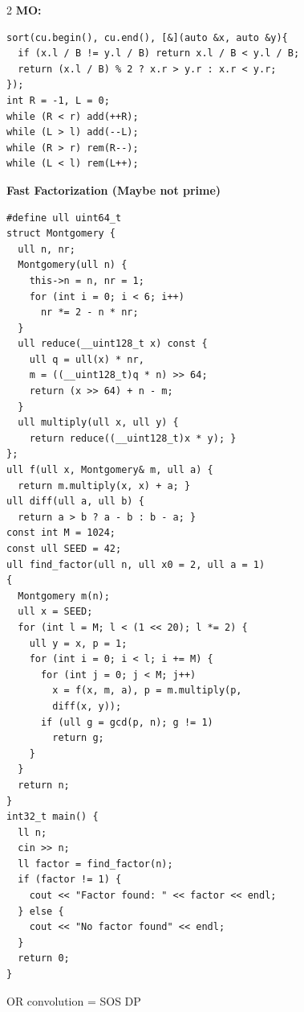 \documentclass[10pt,a4paper]{article}
\begin{document}
\begin{paracol}{2}
\textbf{MO:}
\begin{lstlisting}
sort(cu.begin(), cu.end(), [&](auto &x, auto &y){
  if (x.l / B != y.l / B) return x.l / B < y.l / B;
  return (x.l / B) % 2 ? x.r > y.r : x.r < y.r;
});
int R = -1, L = 0;
while (R < r) add(++R);
while (L > l) add(--L);
while (R > r) rem(R--);
while (L < l) rem(L++);
\end{lstlisting}

\textbf{Fast Factorization (Maybe not prime)}
\begin{lstlisting}
#define ull uint64_t
struct Montgomery {
  ull n, nr;
  Montgomery(ull n) {
    this->n = n, nr = 1;
    for (int i = 0; i < 6; i++)
      nr *= 2 - n * nr;
  }
  ull reduce(__uint128_t x) const {
    ull q = ull(x) * nr,
    m = ((__uint128_t)q * n) >> 64;
    return (x >> 64) + n - m;
  }
  ull multiply(ull x, ull y) {
    return reduce((__uint128_t)x * y); }
};
ull f(ull x, Montgomery& m, ull a) {
  return m.multiply(x, x) + a; }
ull diff(ull a, ull b) {
  return a > b ? a - b : b - a; }
const int M = 1024;
const ull SEED = 42;
ull find_factor(ull n, ull x0 = 2, ull a = 1)
{
  Montgomery m(n);
  ull x = SEED;
  for (int l = M; l < (1 << 20); l *= 2) {
    ull y = x, p = 1;
    for (int i = 0; i < l; i += M) {
      for (int j = 0; j < M; j++)
        x = f(x, m, a), p = m.multiply(p,
        diff(x, y));
      if (ull g = gcd(p, n); g != 1)
        return g;
    }
  }
  return n;
}
int32_t main() {
  ll n;
  cin >> n;
  ll factor = find_factor(n);
  if (factor != 1) {
    cout << "Factor found: " << factor << endl;
  } else {
    cout << "No factor found" << endl;
  }
  return 0;
}
\end{lstlisting}

OR convolution = SOS DP

\end{paracol}
\end{document}
